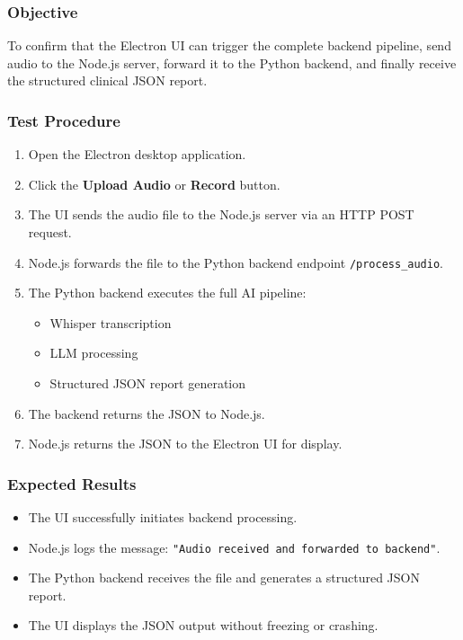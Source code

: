 \subsubsection*{Objective}
To confirm that the Electron UI can trigger the complete backend pipeline, send audio to the Node.js server, forward it to the Python backend, and finally receive the structured clinical JSON report.

\subsubsection*{Test Procedure}
\begin{enumerate}
    \item Open the Electron desktop application.
    \item Click the \textbf{Upload Audio} or \textbf{Record} button.
    \item The UI sends the audio file to the Node.js server via an HTTP POST request.
    \item Node.js forwards the file to the Python backend endpoint \texttt{/process\_audio}.
    \item The Python backend executes the full AI pipeline:
    \begin{itemize}
        \item Whisper transcription
        \item LLM processing
        \item Structured JSON report generation
    \end{itemize}
    \item The backend returns the JSON to Node.js.
    \item Node.js returns the JSON to the Electron UI for display.
\end{enumerate}

\subsubsection*{Expected Results}
\begin{itemize}
    \item The UI successfully initiates backend processing.
    \item Node.js logs the message: \texttt{"Audio received and forwarded to backend"}.
    \item The Python backend receives the file and generates a structured JSON report.
    \item The UI displays the JSON output without freezing or crashing.
\end{itemize}

